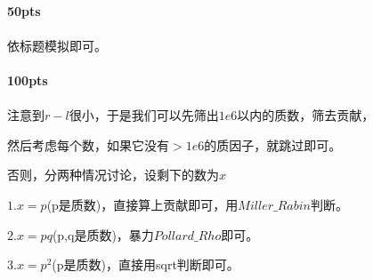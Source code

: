 \documentclass[UTF8]{ctexart}
\begin{document}
\paragraph{50pts}
\paragraph{}依标题模拟即可。
\paragraph{100pts}
\paragraph{}
注意到$r-l$很小，于是我们可以先筛出$1e6$以内的质数，筛去贡献，

然后考虑每个数，如果它没有$>1e6$的质因子，就跳过即可。

否则，分两种情况讨论，设剩下的数为$x$

$1.x=p$(p是质数)，直接算上贡献即可，用$Miller\_Rabin$判断。

$2.x=pq$(p,q是质数)，暴力$Pollard\_Rho$即可。

$3.x=p^2$(p是质数)，直接用sqrt判断即可。
\end{document}
